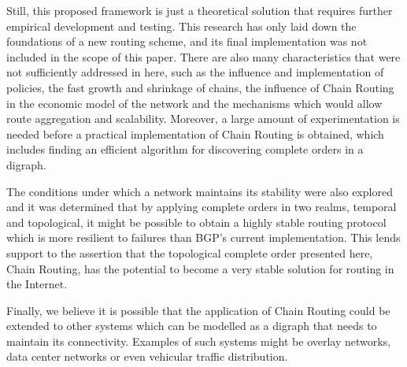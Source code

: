 \documentclass[5p,twocolumn]{elsarticle}
\begin{document}
Still, this proposed framework is just a theoretical solution that requires further empirical development and testing. This research has only laid down the foundations of a new routing scheme, and its final implementation was not included in the scope of this paper. There are also many characteristics that were not sufficiently addressed in here, such as the influence and implementation of policies, the fast growth and shrinkage of chains, the influence of Chain Routing in the economic model of the network and the mechanisms which would allow route aggregation and scalability. Moreover, a large amount of experimentation is needed before a practical implementation of Chain Routing is obtained, which includes finding an efficient algorithm for discovering complete orders in a digraph.



The conditions under which a network maintains its stability were also explored and it was determined that by applying complete orders in two realms, temporal and topological, it might be possible to obtain a highly stable routing protocol which is more resilient to failures than BGP's current implementation. This lends support to the assertion that the topological complete order presented here, Chain Routing, has the potential to become a very stable solution for routing in the Internet.

Finally, we believe it is possible that the application of Chain Routing could be extended to other systems which can be modelled as a digraph that needs to maintain its connectivity. Examples of such systems might be overlay networks, data center networks or even vehicular traffic distribution.





\end{document}
